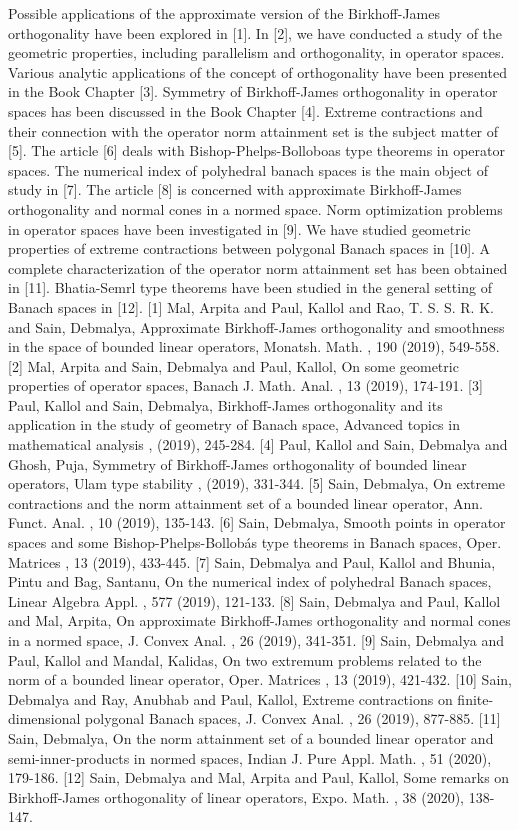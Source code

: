 Possible applications of the approximate version of the Birkhoff-James orthogonality have been explored in [1]. In [2], we have conducted a study of the geometric properties, including parallelism and orthogonality, in operator spaces. Various analytic applications of the concept of orthogonality have been presented in the Book Chapter [3]. Symmetry of Birkhoff-James orthogonality in operator spaces has been discussed in the Book Chapter [4]. Extreme contractions and their connection with the operator norm attainment set is the subject matter of [5]. The article [6] deals with Bishop-Phelps-Bolloboas type theorems in operator spaces. The numerical index of polyhedral banach spaces is the main object of study in [7]. The article [8] is concerned with approximate Birkhoff-James orthogonality and normal cones in a normed space. Norm optimization problems in operator spaces have been investigated in [9]. We have studied geometric properties of extreme contractions between polygonal Banach spaces in [10]. A complete characterization of the operator norm attainment set has been obtained in [11]. Bhatia-Semrl type theorems have been studied in the general setting of Banach spaces in [12].    [1] Mal, Arpita and Paul, Kallol and Rao, T. S. S. R. K. and Sain, Debmalya, Approximate Birkhoff-James orthogonality and smoothness in the space of bounded linear operators, Monatsh. Math. , 190 (2019), 549-558.  [2] Mal, Arpita and Sain, Debmalya and Paul, Kallol, On some geometric properties of operator spaces, Banach J. Math. Anal. , 13 (2019), 174-191.   [3] Paul, Kallol and Sain, Debmalya, Birkhoff-James orthogonality and its application in the study of geometry of Banach space, Advanced topics in mathematical analysis , (2019), 245-284.  [4] Paul, Kallol and Sain, Debmalya and Ghosh, Puja, Symmetry of Birkhoff-James orthogonality of bounded linear operators, Ulam type stability , (2019), 331-344.  [5] Sain, Debmalya, On extreme contractions and the norm attainment set of a bounded linear operator, Ann. Funct. Anal. , 10 (2019), 135-143.  [6] Sain, Debmalya, Smooth points in operator spaces and some Bishop-Phelps-Bollobás type theorems in Banach spaces, Oper. Matrices , 13 (2019), 433-445.  [7] Sain, Debmalya and Paul, Kallol and Bhunia, Pintu and Bag, Santanu, On the numerical index of polyhedral Banach spaces, Linear Algebra Appl. , 577 (2019), 121-133.  [8] Sain, Debmalya and Paul, Kallol and Mal, Arpita, On approximate Birkhoff-James orthogonality and normal cones in a normed space, J. Convex Anal. , 26 (2019), 341-351.  [9] Sain, Debmalya and Paul, Kallol and Mandal, Kalidas, On two extremum problems related to the norm of a bounded linear operator, Oper. Matrices , 13 (2019), 421-432.  [10] Sain, Debmalya and Ray, Anubhab and Paul, Kallol, Extreme contractions on finite-dimensional polygonal Banach spaces, J. Convex Anal. , 26 (2019), 877-885.  [11] Sain, Debmalya, On the norm attainment set of a bounded linear operator and semi-inner-products in normed spaces, Indian J. Pure Appl. Math. , 51 (2020), 179-186.  [12] Sain, Debmalya and Mal, Arpita and Paul, Kallol, Some remarks on Birkhoff-James orthogonality of linear operators, Expo. Math. , 38 (2020), 138-147.


